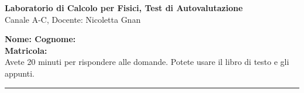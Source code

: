 \documentclass[11pt]{article}
\begin{document}
\pagestyle{empty}

\begin{center}
{\Large \bf  Laboratorio di Calcolo per Fisici, Test di Autovalutazione\\[2mm]}
{\large Canale A-C, Docente: Nicoletta Gnan}
\end{center}
\vspace{4mm}

\begin{mdframed}[backgroundcolor=panna]
{\bf Nome: \qquad \qquad \qquad\qquad \qquad \qquad Cognome:}\\
\newline
{\bf Matricola:}\\
Avete 20 minuti per rispondere alle domande. Potete usare il libro di testo e gli appunti.
\end{mdframed}
%
%

\hrule
\vspace{2mm}
\end{document}
